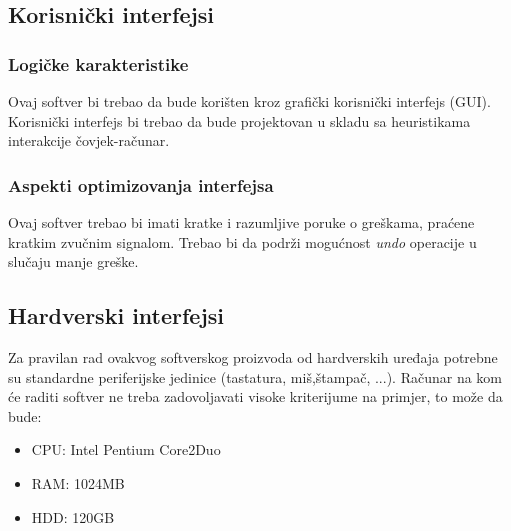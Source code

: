 \subsection{Korisnički interfejsi}
\subsubsection{Logičke karakteristike}
Ovaj softver bi trebao da bude korišten kroz grafički korisnički interfejs (GUI). Korisnički interfejs bi trebao da bude projektovan u skladu sa heuristikama interakcije čovjek-računar.
\subsubsection{Aspekti optimizovanja interfejsa}
Ovaj softver trebao bi imati kratke i razumljive poruke o greškama, praćene kratkim zvučnim signalom. Trebao bi da podrži mogućnost \textit{undo} operacije u slučaju manje greške.
\subsection{Hardverski interfejsi}
Za pravilan rad ovakvog softverskog proizvoda od hardverskih uređaja potrebne su standardne periferijske jedinice (tastatura, miš,štampač, ...). Računar na kom će raditi softver ne treba zadovoljavati visoke kriterijume na primjer, to može da bude:
\begin{itemize}
  \item CPU: Intel Pentium Core2Duo 
  \item RAM: 1024MB
  \item HDD: 120GB
\end{itemize}
